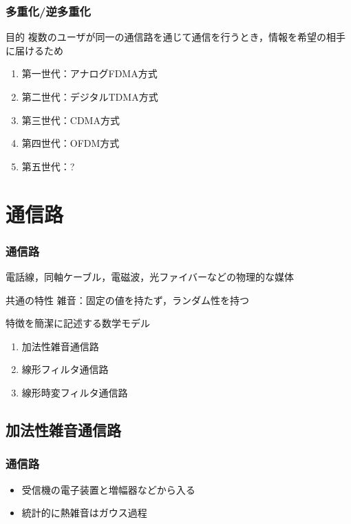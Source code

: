 \documentclass[dvipdfmx]{beamer}  %
\begin{document}
\begin{frame}
	\frametitle{多重化/逆多重化}
	\begin{block}{目的}
		複数のユーザが同一の通信路を通じて通信を行うとき，情報を希望の相手に届けるため
	\end{block}
	
	\begin{enumerate}
		\item 第一世代：アナログFDMA方式
		\item 第二世代：デジタルTDMA方式
		\item 第三世代：CDMA方式
		\item 第四世代：OFDM方式
		\item 第五世代：?
	\end{enumerate}
\end{frame}

\section{通信路}
\begin{frame}
	\frametitle{通信路}
	電話線，同軸ケーブル，電磁波，光ファイバーなどの物理的な媒体
	
	\begin{block}{共通の特性}
		雑音：固定の値を持たず，ランダム性を持つ
	\end{block}
	
	特徴を簡潔に記述する数学モデル
	\begin{enumerate}
		\item 加法性雑音通信路
		\item 線形フィルタ通信路
		\item 線形時変フィルタ通信路
	\end{enumerate}
\end{frame}

\subsection{加法性雑音通信路}
\begin{frame}
	\frametitle{通信路}
	\begin{center}
	\end{center}
	
	\begin{itemize}
		\item 受信機の電子装置と増幅器などから入る
		\item 統計的に熱雑音はガウス過程
	\end{itemize}
\end{frame}
\end{document}
